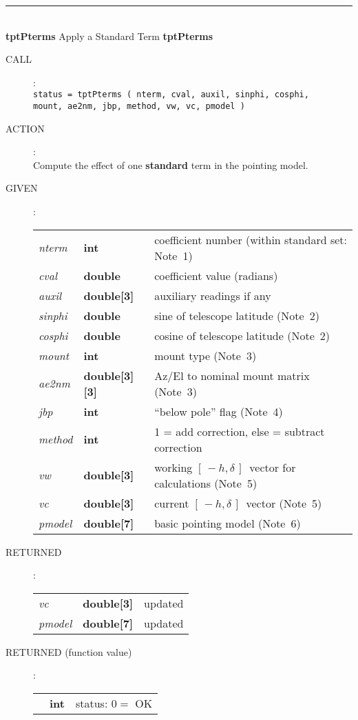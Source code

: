 \documentclass[12pt,fleqn,twoside]{article}
\renewcommand{\_}{{\tt\char'137}}     %
\newcommand{\mhadec}     {$[\,-h,\delta\,]$}
\newcommand{\routine}[2]
{
  \newpage
  \rule{\textwidth}{0.3mm}\\ \nopagebreak
  {\Large {\bf #1} \hfill #2 \hfill {\bf #1}}
  \vspace{-1ex}
}
\newcommand{\call}[1]
{
  \goodbreak
  \begin{description}
    \item[CALL]: \\[0.5ex] \nopagebreak
        {\tt #1}
  \end{description}
  \vspace{-3ex}
}
\newcommand{\action}[1]
{
  \goodbreak
  \begin{description}
    \item[ACTION]: \\[0.5ex] \nopagebreak
        #1
  \end{description}
  \vspace{-3ex}
}
\newcommand{\args}[2]
{
  \goodbreak
  \begin{description}
  \item[#1]: \\[1.5ex] \nopagebreak
    \hspace*{-0.9em}
    \begin{tabular}{p{4.5em}p{5.8em}p{23.5em}}
      #2
    \end{tabular}
  \end{description}
  \vspace{-3ex}
}
\newcommand{\spec}[3]
{
  {\em {#1}} & {\bf \mbox{#2}} & {#3}
}
\begin{document}
\routine{tptPterms}{Apply a Standard Term}
\label{tptPterms}
\call{status = tptPterms ( nterm, cval, auxil, sinphi, cosphi, \\
            \hspace*{10em} mount, ae2nm, jbp, method, vw, vc, pmodel )}
\action{Compute the effect of one {\bf standard}
        term in the pointing model.}
\args{GIVEN}
{
\spec{nterm}{int}{coefficient number (within standard set: Note~1)} \\
\spec{cval}{double}{coefficient value (radians)} \\
\spec{auxil}{double[3]}{auxiliary readings if any} \\
\spec{sinphi}{double}{sine of telescope latitude (Note~2)} \\
\spec{cosphi}{double}{cosine of telescope latitude (Note~2)} \\
\spec{mount}{int}{mount type (Note~3)} \\
\spec{ae2nm}{double[3][3]}{Az/El to nominal mount matrix (Note~3)} \\
\spec{jbp}{int}{``below pole'' flag (Note~4)} \\
\spec{method}{int}{1 = add correction, else = subtract correction} \\
\spec{vw}{double[3]}{working \mhadec\ vector for calculations (Note~5)} \\
\spec{vc}{double[3]}{current \mhadec\ vector (Note~5)} \\
\spec{pmodel}{double[7]}{basic pointing model (Note~6)} \\
}
\args{RETURNED}
{
\spec{vc}{double[3]}{updated} \\
\spec{pmodel}{double[7]}{updated}
}
\args{RETURNED \rm (function value)}
{
\spec{}{int}{status: $0 =$ OK}
}
\end{document}
